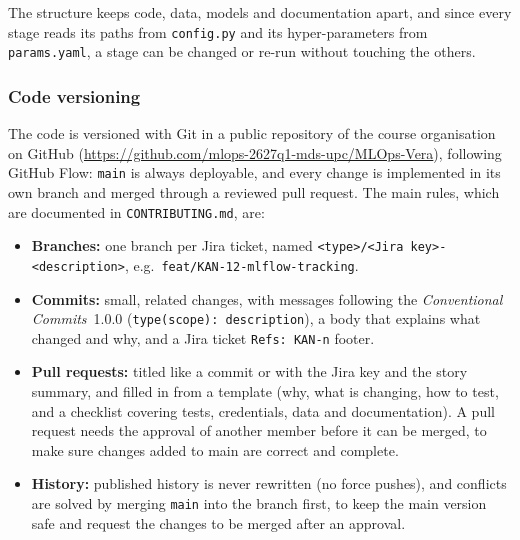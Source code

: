 \documentclass[11pt]{article}
\begin{document}
The structure keeps code, data, models and documentation apart, and since every stage reads its paths from \texttt{config.py} and its hyper-parameters from \texttt{params.yaml}, a stage can be changed or re-run without touching the others.

\subsubsection{Code versioning}
\label{sec:code-versioning}

The code is versioned with Git in a public repository of the course organisation on GitHub (\url{https://github.com/mlops-2627q1-mds-upc/MLOps-Vera}), following GitHub Flow: \texttt{main} is always deployable, and every change is implemented in its own branch and merged through a reviewed pull request. The main rules, which are documented in \texttt{CONTRIBUTING.md}, are:
\medskip

\begin{itemize}[nosep,leftmargin=1.4em]
  \item \textbf{Branches:} one branch per Jira ticket, named \texttt{<type>/<Jira key>-<description>}, e.g.\ \texttt{feat/\allowbreak KAN-12-mlflow-tracking}.

\medskip

  \item \textbf{Commits:} small, related changes, with messages following the \emph{Conventional Commits}~1.0.0  (\texttt{type\allowbreak(scope): description}), a body that explains what changed and why, and a Jira ticket \texttt{Refs: KAN-n} footer.

\medskip

  \item \textbf{Pull requests:} titled like a commit or with the Jira key and the story summary, and filled in from a template (why, what is changing, how to test, and a checklist covering tests, credentials, data and documentation). A pull request needs the approval of another member before it can be merged, to make sure changes added to main are correct and complete.

\medskip

  \item \textbf{History:} published history is never rewritten (no force pushes), and  conflicts are solved by merging \texttt{main} into the branch first, to keep the main version safe and request the changes to be merged after an approval.
\end{itemize}

\medskip
\end{document}
